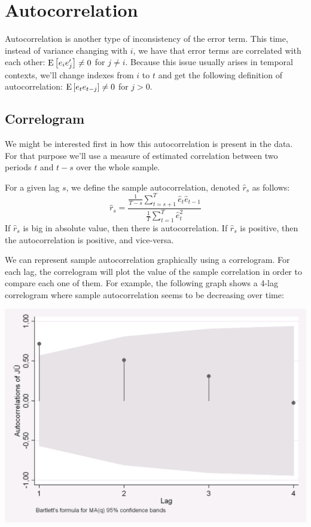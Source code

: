 \section{Autocorrelation}

Autocorrelation is another type of inconsistency of the error term. This time, instead of variance changing with $i$, we have that error terms are correlated with each other: $\operatorname{E}\left[e_ie_j'\right] \neq 0$ for $j\neq i$. Because this issue usually arises in temporal contexts, we'll change indexes from $i$ to $t$ and get the following definition of autocorrelation: $\operatorname{E}\left[e_te_{t-j}\right]\neq 0$ for $j > 0$. 

\subsection{Correlogram}

We might be interested first in how this autocorrelation is present in the data. For that purpose we'll use a measure of estimated correlation between two periods $t$ and $t-s$ over the whole sample.

\begin{definition}
For a given lag $s$, we define the sample autocorrelation, denoted $\hat r_s$ as follows: $$\hat r_s = \frac{\frac{1}{T - s}\sum_{t = s+1}^{T}\hat e_t\hat e_{t-1}}{\frac{1}{T}\sum_{t = 1}^{T}\hat e_t^2} $$ If $\hat r_s$ is big in absolute value, then there is autocorrelation. If $\hat r_s$ is positive, then the autocorrelation is positive, and vice-versa.
\end{definition}

We can represent sample autocorrelation graphically using a correlogram. For each lag, the correlogram will plot the value of the sample correlation in order to compare each one of them. For example, the following graph shows a 4-lag correlogram where sample autocorrelation seems to be decreasing over time: \begin{center}
\includegraphics[scale=0.25]{images/defcorrelogram}
\end{center}

